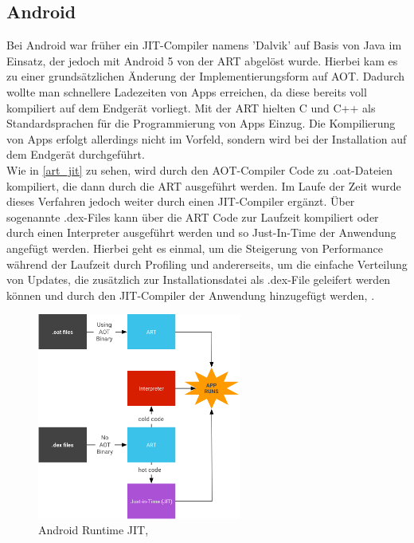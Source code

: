 \subsection{Android} \label{android_bsp}
Bei Android war früher ein \ac{JIT}-Compiler namens 'Dalvik' auf Basis von Java im Einsatz, der jedoch mit Android 5 von der \ac{ART} abgelöst wurde. Hierbei kam es zu einer grundsätzlichen Änderung der Implementierungsform auf \ac{AOT}. Dadurch wollte man schnellere Ladezeiten von Apps erreichen, da diese bereits voll kompiliert auf dem Endgerät vorliegt. Mit der \ac{ART} hielten C und C++ als Standardsprachen für die Programmierung von Apps Einzug. Die Kompilierung von Apps erfolgt allerdings nicht im Vorfeld, sondern wird bei der Installation auf dem Endgerät durchgeführt.\\
Wie in \autoref{art_jit} zu sehen, wird durch den \ac{AOT}-Compiler Code zu .oat-Dateien kompiliert, die dann durch die \ac{ART} ausgeführt werden. Im Laufe der Zeit wurde dieses Verfahren jedoch weiter durch einen \ac{JIT}-Compiler ergänzt. Über sogenannte .dex-Files kann über die \ac{ART} Code zur Laufzeit kompiliert oder durch einen Interpreter ausgeführt werden und so Just-In-Time der Anwendung angefügt werden. Hierbei geht es einmal, um die Steigerung von Performance während der Laufzeit durch Profiling und andererseits, um die einfache Verteilung von Updates, die zusätzlich zur Installationsdatei als .dex-File geleifert werden können und durch den \ac{JIT}-Compiler der Anwendung hinzugefügt werden, \cite[vgl. Android 2022, Webseite abgerufen am 03.12.2022]{android_runtime}.
\begin{figure}[ht]
    \begin{center}
        \includegraphics[width=0.6\textwidth]{assets/img/jit-arch.png}
        \caption{Android Runtime JIT, \cite[Quelle: Android 2022, Webseite abgerufen am 03.12.2022]{android_runtime}}
        \label{art_jit}
    \end{center}
\end{figure}

